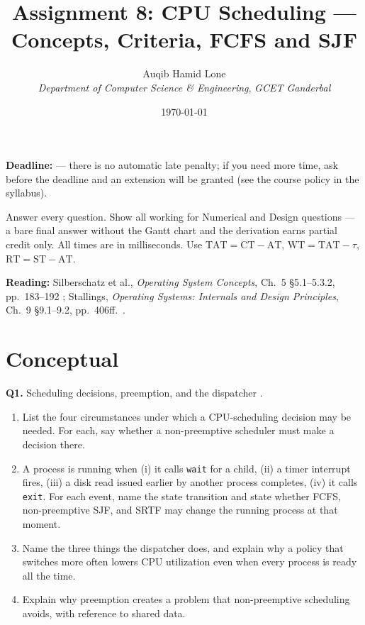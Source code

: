 \documentclass[11pt]{article}
\title{Assignment 8: CPU Scheduling --- Concepts, Criteria, FCFS and SJF}
\author{Auqib Hamid Lone\\[0.3em]
  \emph{Department of Computer Science \& Engineering}, \emph{GCET Ganderbal}}
\date{\today}
\begin{document}
\maketitle

\noindent\textbf{Deadline:}  --- there is no automatic late penalty; if you need more time, ask before the deadline and an extension will be granted (see the course policy in the syllabus).

\noindent Answer every question. Show all working for Numerical and Design questions --- a bare final answer without the Gantt chart and the derivation earns partial credit only. All times are in milliseconds. Use $\mathrm{TAT} = \mathrm{CT} - \mathrm{AT}$, $\mathrm{WT} = \mathrm{TAT} - \tau$, $\mathrm{RT} = \mathrm{ST} - \mathrm{AT}$.

\noindent\textbf{Reading:} Silberschatz et al., \emph{Operating System Concepts}, Ch.~5 \S5.1--5.3.2, pp.~183--192 \cite{SilberschatzOSC_operating_system_concepts}; Stallings, \emph{Operating Systems: Internals and Design Principles}, Ch.~9 \S9.1--9.2, pp.~406ff.\ \cite{StallingsOS_internals_design_principles}.

\section{Conceptual}

\textbf{Q1.} Scheduling decisions, preemption, and the dispatcher \cite{SilberschatzOSC_operating_system_concepts}.
\begin{enumerate}
  \item[(a)] List the four circumstances under which a CPU-scheduling decision may be needed. For each, say whether a non-preemptive scheduler must make a decision there.
  \item[(b)] A process is running when (i) it calls \texttt{wait} for a child, (ii) a timer interrupt fires, (iii) a disk read issued earlier by another process completes, (iv) it calls \texttt{exit}. For each event, name the state transition and state whether FCFS, non-preemptive SJF, and SRTF may change the running process at that moment.
  \item[(c)] Name the three things the dispatcher does, and explain why a policy that switches more often lowers CPU utilization even when every process is ready all the time.
  \item[(d)] Explain why preemption creates a problem that non-preemptive scheduling avoids, with reference to shared data.
\end{enumerate}
\end{document}
